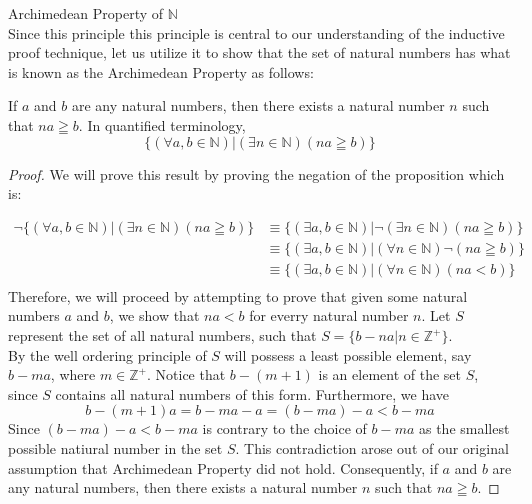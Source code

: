 \begin{definition}
Archimedean Property of $\mathbb{N}$ \\

Since this principle this principle is central to our understanding of the inductive proof technique, let us utilize it to show that the set of natural numbers has what is known as the Archimedean Property as follows: 

\begin{tcolorbox}
	\begin{theorem}		
		If $a$ and $b$ are any natural numbers, then there exists a natural number $n$ such that $na \geqq b$. In quantified terminology,
		    \begin{equation*}
		        \{ (\forall a, b \in \mathbb{N})| (\exists n \in \mathbb{N})(na \geqq b) \}
		    \end{equation*}
	\end{theorem}
\end{tcolorbox}

\begin{proof}
   
    We will prove this result by proving the negation of the proposition which is: 
    
        \begin{align*}
            \neg \{ (\forall a, b \in \mathbb{N})| (\exists n \in \mathbb{N})(na \geqq b) \} & \equiv \{ (\exists a, b \in \mathbb{N})| \neg (\exists n \in \mathbb{N})(na \geqq b) \} \nonumber\\
                   & \equiv \{ (\exists a, b \in \mathbb{N})| (\forall n \in \mathbb{N}) \neg (na \geqq b) \} \nonumber\\
                   & \equiv \{ (\exists a, b \in \mathbb{N})| (\forall n \in \mathbb{N})(na < b) \} \nonumber\\
        \end{align*}
    Therefore, we will proceed by attempting to prove that given some natural numbers $a$ and $b$, we show that $na < b$ for everry natural number $n$. Let $S$ represent the set of all natural numbers, such  that  $S = \{b-na| n \in \mathbb{Z}^+ \}$. \\
    
    By the well ordering principle of $S$ will possess a least possible element, say $b-ma$, where $m \in \mathbb{Z}^+$. Notice that $b-(m+1)$ is an element of the set $S$, since $S$ contains all natural numbers of this form. Furthermore, we have
        \begin{equation*}
            b-(m+1)a =  b - ma - a = (b-ma) - a < b - ma
        \end{equation*}
    Since $(b -ma) - a < b - ma$ is contrary to the choice of $b-ma$ as the smallest possible natiural number in the set $S$. This contradiction arose out of our original assumption that Archimedean Property did not hold. Consequently, if $a$ and $b$ are any natural numbers, then there exists a natural number $n$ such that $na \geqq b$.
 
\end{proof}
\end{definition}

